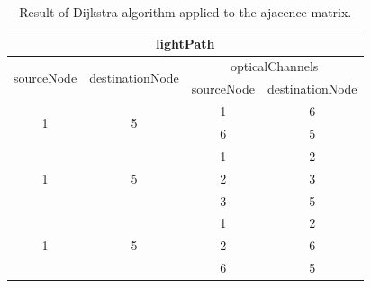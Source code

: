 \begin{table}[H]
	\centering
	\begin{tabular}{|c|l|c|l|c|l|c|l|}
		\hline
		\multicolumn{8}{|c|}{lightPath}                                                                                                                                                    \\ \hline
		\multicolumn{2}{|c|}{\multirow{2}{*}{sourceNode}} & \multicolumn{2}{c|}{\multirow{2}{*}{destinationNode}} & \multicolumn{4}{c|}{opticalChannels}                                   \\ \cline{5-8} 
		\multicolumn{2}{|c|}{}                            & \multicolumn{2}{c|}{}                                 & \multicolumn{2}{c|}{sourceNode} & \multicolumn{2}{c|}{destinationNode} \\ \hline
		\multicolumn{2}{|c|}{\multirow{2}{*}{1}}          & \multicolumn{2}{c|}{\multirow{2}{*}{5}}               & \multicolumn{2}{c|}{1}          & \multicolumn{2}{c|}{6}               \\ \cline{5-8} 
		\multicolumn{2}{|c|}{}                            & \multicolumn{2}{c|}{}                                 & \multicolumn{2}{c|}{6}          & \multicolumn{2}{c|}{5}               \\ \hline
		\multicolumn{2}{|c|}{\multirow{3}{*}{1}}          & \multicolumn{2}{c|}{\multirow{3}{*}{5}}               & \multicolumn{2}{c|}{1}          & \multicolumn{2}{c|}{2}               \\ \cline{5-8} 
		\multicolumn{2}{|c|}{}                            & \multicolumn{2}{c|}{}                                 & \multicolumn{2}{c|}{2}          & \multicolumn{2}{c|}{3}               \\ \cline{5-8} 
		\multicolumn{2}{|c|}{}                            & \multicolumn{2}{c|}{}                                 & \multicolumn{2}{c|}{3}          & \multicolumn{2}{c|}{5}               \\ \hline
		\multicolumn{2}{|c|}{\multirow{3}{*}{1}}          & \multicolumn{2}{c|}{\multirow{3}{*}{5}}               & \multicolumn{2}{c|}{1}          & \multicolumn{2}{c|}{2}               \\ \cline{5-8} 
		\multicolumn{2}{|c|}{}                            & \multicolumn{2}{c|}{}                                 & \multicolumn{2}{c|}{2}          & \multicolumn{2}{c|}{6}               \\ \cline{5-8} 
		\multicolumn{2}{|c|}{}                            & \multicolumn{2}{c|}{}                                 & \multicolumn{2}{c|}{6}          & \multicolumn{2}{c|}{5}               \\ \hline
	\end{tabular}
	\caption{Result of Dijkstra algorithm applied to the ajacence matrix.}
\end{table}

